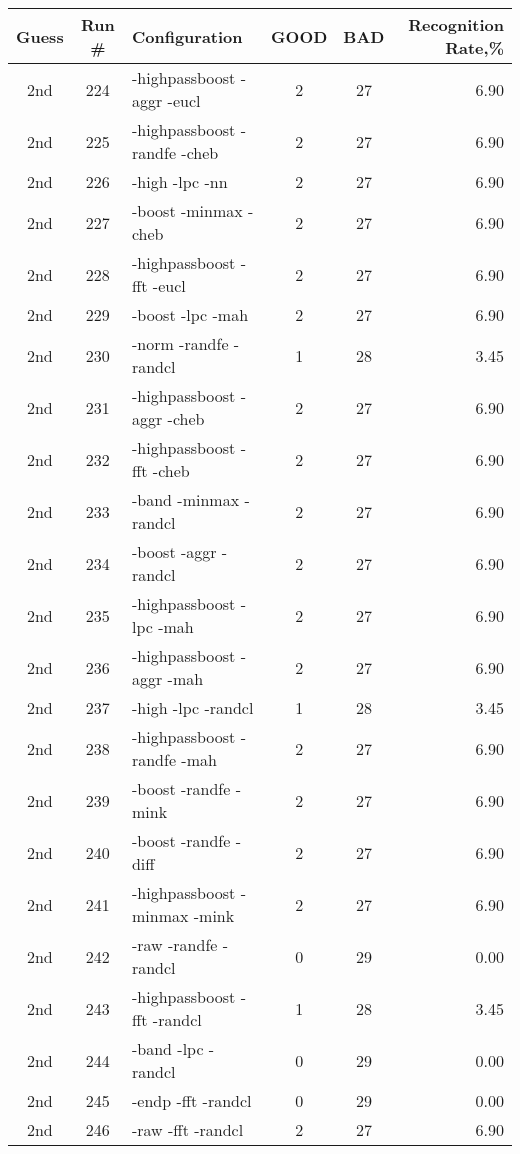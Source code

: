 \begin{table}
\begin{minipage}[b]{\textwidth}
\centering
\begin{tabular}{|c|c|l|c|c|r|} \hline
Guess & Run \# & Configuration & GOOD & BAD & Recognition Rate,\%\\ \hline\hline
2nd & 224 & -highpassboost -aggr -eucl  & 2 & 27 & 6.90\\ \hline
2nd & 225 & -highpassboost -randfe -cheb  & 2 & 27 & 6.90\\ \hline
2nd & 226 & -high -lpc -nn  & 2 & 27 & 6.90\\ \hline
2nd & 227 & -boost -minmax -cheb  & 2 & 27 & 6.90\\ \hline
2nd & 228 & -highpassboost -fft -eucl  & 2 & 27 & 6.90\\ \hline
2nd & 229 & -boost -lpc -mah  & 2 & 27 & 6.90\\ \hline
2nd & 230 & -norm -randfe -randcl  & 1 & 28 & 3.45\\ \hline
2nd & 231 & -highpassboost -aggr -cheb  & 2 & 27 & 6.90\\ \hline
2nd & 232 & -highpassboost -fft -cheb  & 2 & 27 & 6.90\\ \hline
2nd & 233 & -band -minmax -randcl  & 2 & 27 & 6.90\\ \hline
2nd & 234 & -boost -aggr -randcl  & 2 & 27 & 6.90\\ \hline
2nd & 235 & -highpassboost -lpc -mah  & 2 & 27 & 6.90\\ \hline
2nd & 236 & -highpassboost -aggr -mah  & 2 & 27 & 6.90\\ \hline
2nd & 237 & -high -lpc -randcl  & 1 & 28 & 3.45\\ \hline
2nd & 238 & -highpassboost -randfe -mah  & 2 & 27 & 6.90\\ \hline
2nd & 239 & -boost -randfe -mink  & 2 & 27 & 6.90\\ \hline
2nd & 240 & -boost -randfe -diff  & 2 & 27 & 6.90\\ \hline
2nd & 241 & -highpassboost -minmax -mink  & 2 & 27 & 6.90\\ \hline
2nd & 242 & -raw -randfe -randcl  & 0 & 29 & 0.00\\ \hline
2nd & 243 & -highpassboost -fft -randcl  & 1 & 28 & 3.45\\ \hline
2nd & 244 & -band -lpc -randcl  & 0 & 29 & 0.00\\ \hline
2nd & 245 & -endp -fft -randcl  & 0 & 29 & 0.00\\ \hline
2nd & 246 & -raw -fft -randcl  & 2 & 27 & 6.90\\ \hline

\end{tabular}
\end{minipage}
\end{table}
